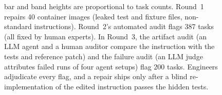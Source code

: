 \begin{figure}[t]
{bar and band heights are proportional to task counts. Round~1 repairs 40
container images (leaked test and fixture files, non-standard instructions).
Round~2's automated audit flags 387 tasks (all fixed by human experts). In Round~3, the artifact audit (an LLM agent and a human
auditor compare the instruction with the tests and reference patch) and the
failure audit (an LLM judge attributes failed runs of four agent setups) flag
200 tasks. Engineers adjudicate every flag, and a repair ships only after a
blind re-implementation of the edited instruction passes the hidden tests.}
\label{fig:pipeline}
\end{figure}